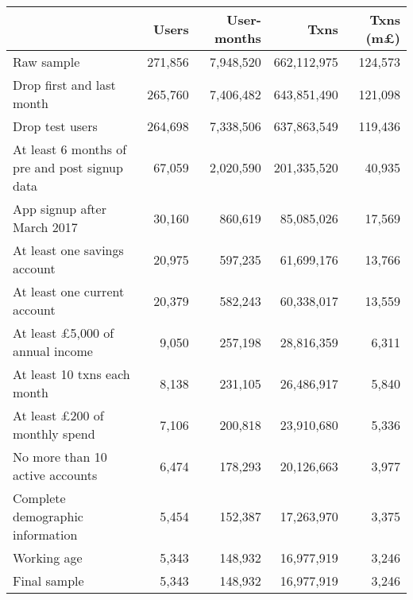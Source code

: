 \begin{tabular}{lrrrr}
\toprule
                                              &   Users & User-months &        Txns & Txns (m\pounds) \\
\midrule
                                   Raw sample & 271,856 &   7,948,520 & 662,112,975 &         124,573 \\
                    Drop first and last month & 265,760 &   7,406,482 & 643,851,490 &         121,098 \\
                              Drop test users & 264,698 &   7,338,506 & 637,863,549 &         119,436 \\
At least 6 months of pre and post signup data &  67,059 &   2,020,590 & 201,335,520 &          40,935 \\
                  App signup after March 2017 &  30,160 &     860,619 &  85,085,026 &          17,569 \\
                 At least one savings account &  20,975 &     597,235 &  61,699,176 &          13,766 \\
                 At least one current account &  20,379 &     582,243 &  60,338,017 &          13,559 \\
       At least \pounds5,000 of annual income &   9,050 &     257,198 &  28,816,359 &           6,311 \\
                  At least 10 txns each month &   8,138 &     231,105 &  26,486,917 &           5,840 \\
         At least \pounds200 of monthly spend &   7,106 &     200,818 &  23,910,680 &           5,336 \\
              No more than 10 active accounts &   6,474 &     178,293 &  20,126,663 &           3,977 \\
             Complete demographic information &   5,454 &     152,387 &  17,263,970 &           3,375 \\
                                  Working age &   5,343 &     148,932 &  16,977,919 &           3,246 \\
                                 Final sample &   5,343 &     148,932 &  16,977,919 &           3,246 \\
\bottomrule
\end{tabular}
